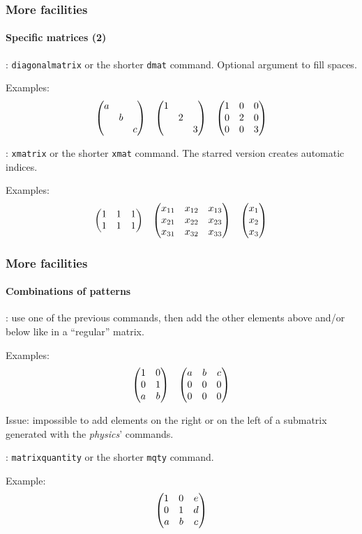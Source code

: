 \documentclass[11pt]{beamer}
\begin{document}
\begin{frame}
	\frametitle{More facilities}
	\framesubtitle{Specific matrices (2)}
	
	: \texttt{diagonalmatrix} or the shorter \texttt{dmat} command.
	Optional argument to fill spaces.
	
	Examples:
	\begin{align*}
		\begin{pmatrix}
			\dmat{a,b,c}
		\end{pmatrix}
		&&
		\begin{pmatrix}
			\dmat{1,2,3}
		\end{pmatrix}
		&&
		\begin{pmatrix}
			\dmat[0]{1,2,3}
		\end{pmatrix}
	\end{align*}
	
	
	: \texttt{xmatrix} or the shorter \texttt{xmat} command.
	The starred version creates automatic indices.
	
	Examples:
	\begin{align*}
		\begin{pmatrix}
			\xmat{1}{2}{3}
		\end{pmatrix}
		&&
		\begin{pmatrix}
			\xmat*{x}{3}{3}
		\end{pmatrix}
		&&
		\begin{pmatrix}
			\xmat*{x}{3}{1}
		\end{pmatrix}
	\end{align*}
\end{frame}


\begin{frame}
	\frametitle{More facilities}
	\framesubtitle{Combinations of patterns}
	
	: use one of the previous commands, then add the other elements above and/or below like in a \enquote{regular} matrix.
	
	Examples:
	\begin{align*}
		\begin{pmatrix}
			\imat{2} \\ a & b
		\end{pmatrix}
		&&
		\begin{pmatrix}
			a & b & c \\
			\zmat{2}{3}
		\end{pmatrix}
	\end{align*}
	
	Issue: impossible to add elements on the right or on the left of a submatrix generated with the \emph{physics}' commands.
	

	: \texttt{matrixquantity} or the shorter \texttt{mqty} command. 
	
	Example:
	\begin{equation*}
		\begin{pmatrix}
			\mqty{\imat{2}} & \mqty{e\\d} \\
			\mqty{a & b} & c
		\end{pmatrix}
	\end{equation*}
\end{frame}
\end{document}
